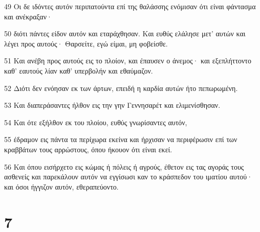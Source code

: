 \par 49 Οι δε ιδόντες αυτόν περιπατούντα επί της θαλάσσης ενόμισαν ότι είναι φάντασμα και ανέκραξαν·
\par 50 διότι πάντες είδον αυτόν και εταράχθησαν. Και ευθύς ελάλησε μετ' αυτών και λέγει προς αυτούς· Θαρσείτε, εγώ είμαι, μη φοβείσθε.
\par 51 Και ανέβη προς αυτούς εις το πλοίον, και έπαυσεν ο άνεμος· και εξεπλήττοντο καθ' εαυτούς λίαν καθ' υπερβολήν και εθαύμαζον.
\par 52 Διότι δεν ενόησαν εκ των άρτων, επειδή η καρδία αυτών ήτο πεπωρωμένη.
\par 53 Και διαπεράσαντες ήλθον εις την γην Γεννησαρέτ και ελιμενίσθησαν.
\par 54 Και ότε εξήλθον εκ του πλοίου, ευθύς γνωρίσαντες αυτόν,
\par 55 έδραμον εις πάντα τα περίχωρα εκείνα και ήρχισαν να περιφέρωσιν επί των κραββάτων τους αρρώστους, όπου ήκουον ότι είναι εκεί.
\par 56 Και όπου εισήρχετο εις κώμας ή πόλεις ή αγρούς, έθετον εις τας αγοράς τους ασθενείς και παρεκάλουν αυτόν να εγγίσωσι καν το κράσπεδον του ιματίου αυτού· και όσοι ήγγιζον αυτόν, εθεραπεύοντο.

\chapter{7}

